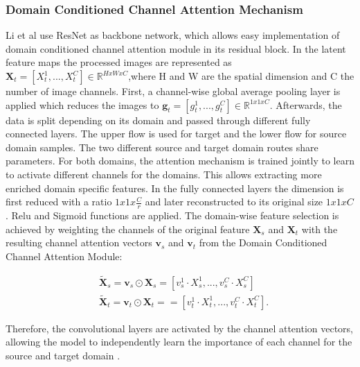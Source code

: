 \subsubsection{Domain Conditioned Channel Attention Mechanism}
Li et al \cite{li2020} use ResNet as backbone network, which allows easy implementation of domain conditioned channel attention module in its residual block. In the latent feature maps the processed images are represented as $\pmb{X}_{t} = [X^{1}_{t},...,X^{C}_{t}] \in \mathbb{R}^{HxWxC}$,where H and W are the spatial dimension and C the number of image channels. First, a channel-wise global average pooling layer is applied which reduces the images to  $\pmb{g}_{t} = [g^{1}_{t},...,g^{C}_{t}] \in \mathbb{R}^{1x1xC}$. Afterwards, the data is split depending on its domain and passed through different fully connected layers. The upper flow is used for target and the lower flow for source domain samples. The two different source and target domain routes share parameters. For both domains, the attention mechanism is trained jointly to learn to activate different channels for the domains. This allows extracting more enriched domain specific features. In the fully connected layers the dimension is first reduced with a ratio ${1x1x\frac{C}{r}}$ and later reconstructed to its original size ${1x1xC}$. Relu and Sigmoid functions are applied. The domain-wise feature selection is achieved by weighting the channels of the original feature $\pmb{X}_{s}$ and $\pmb{X}_{t}$ with the resulting channel attention vectors $\pmb{v}_{s}$ and $\pmb{v}_{t}$ from the Domain Conditioned Channel Attention Module:

\begin{equation}
    \begin{aligned}
        &\pmb{\tilde{X}}_{s} = \pmb{v}_{s} \odot \pmb{X}_{s} = [v_{s}^{1} \cdot X_{s}^{1}, ..., v_{s}^{C} \cdot X_{s}^{C}]\\
        &\pmb{\tilde{X}}_{t} = \pmb{v}_{t} \odot \pmb{X}_{t} = = [v_{t}^{1} \cdot X_{t}^{1}, ..., v_{t}^{C} \cdot X_{t}^{C}].
    \end{aligned}
\end{equation}

Therefore, the convolutional layers are activated by the channel attention vectors, allowing the model to independently learn the importance of each channel for the source and target domain \cite{li2020}.


